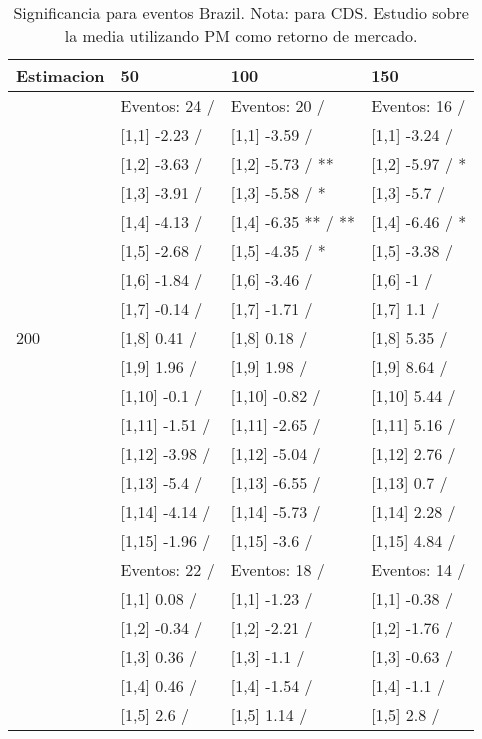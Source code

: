 \begin{table}

\caption{Significancia para eventos Brazil. Nota: para CDS. Estudio sobre la media utilizando PM como retorno de mercado.}
\centering
\begin{tabular}[t]{llll}
\toprule
Estimacion & 50 & 100 & 150\\
\midrule
 & Eventos:  24 / & Eventos:  20 / & Eventos:  16 /\\
 & {}[1,1] -2.23  / & {}[1,1] -3.59  / & {}[1,1] -3.24  /\\
 & {}[1,2] -3.63  / & {}[1,2] -5.73  / ** & {}[1,2] -5.97  / *\\
 & {}[1,3] -3.91  / & {}[1,3] -5.58  / * & {}[1,3] -5.7  /\\
 & {}[1,4] -4.13  / & {}[1,4] -6.35 ** / ** & {}[1,4] -6.46  / *\\
\addlinespace
 & {}[1,5] -2.68  / & {}[1,5] -4.35  / * & {}[1,5] -3.38  /\\
 & {}[1,6] -1.84  / & {}[1,6] -3.46  / & {}[1,6] -1  /\\
 & {}[1,7] -0.14  / & {}[1,7] -1.71  / & {}[1,7] 1.1  /\\
200 & {}[1,8] 0.41  / & {}[1,8] 0.18  / & {}[1,8] 5.35  /\\
 & {}[1,9] 1.96  / & {}[1,9] 1.98  / & {}[1,9] 8.64  /\\
\addlinespace
 & {}[1,10] -0.1  / & {}[1,10] -0.82  / & {}[1,10] 5.44  /\\
 & {}[1,11] -1.51  / & {}[1,11] -2.65  / & {}[1,11] 5.16  /\\
 & {}[1,12] -3.98  / & {}[1,12] -5.04  / & {}[1,12] 2.76  /\\
 & {}[1,13] -5.4  / & {}[1,13] -6.55  / & {}[1,13] 0.7  /\\
 & {}[1,14] -4.14  / & {}[1,14] -5.73  / & {}[1,14] 2.28  /\\
\addlinespace
 & {}[1,15] -1.96  / & {}[1,15] -3.6  / & {}[1,15] 4.84  /\\
 & Eventos:  22 / & Eventos:  18 / & Eventos:  14 /\\
 & {}[1,1] 0.08  / & {}[1,1] -1.23  / & {}[1,1] -0.38  /\\
 & {}[1,2] -0.34  / & {}[1,2] -2.21  / & {}[1,2] -1.76  /\\
 & {}[1,3] 0.36  / & {}[1,3] -1.1  / & {}[1,3] -0.63  /\\
\addlinespace
 & {}[1,4] 0.46  / & {}[1,4] -1.54  / & {}[1,4] -1.1  /\\
 & {}[1,5] 2.6  / & {}[1,5] 1.14  / & {}[1,5] 2.8  /\\

\end{tabular}
\end{table}
